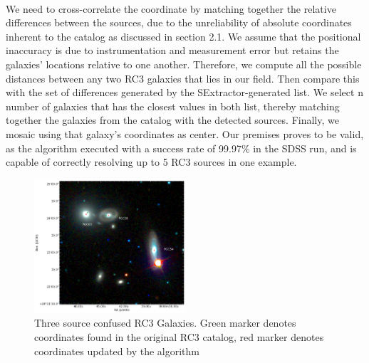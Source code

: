\documentclass[5p]{elsarticle}
\begin{document}
\\
\indent  We need to cross-correlate the coordinate by matching together the relative differences between the sources, due to the unreliability of absolute coordinates inherent to the catalog as discussed in section 2.1. We assume that the positional inaccuracy is due to  instrumentation and measurement error but retains the galaxies' locations relative to one another.  %
Therefore, we compute all the possible distances between any two RC3 galaxies that lies in our field. Then compare this with the set of differences generated by the SExtractor-generated list. We select n number of galaxies that has the closest values in both list, thereby matching together the galaxies from the catalog  with the detected sources. Finally, we mosaic using that galaxy's coordinates as center. Our premises proves to be valid, as the algorithm executed with a success rate of 99.97\% in the SDSS run, and is capable of correctly resolving up to 5 RC3 sources in one example.
		\begin{figure}[h]
		\includegraphics[width=0.5\textwidth]{figures/navigator}
		\caption{Three source confused RC3 Galaxies. Green marker denotes coordinates found in the original RC3 catalog, red marker denotes coordinates updated by the algorithm}
	\end{figure}
\end{document}
